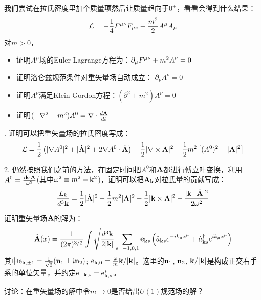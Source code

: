 \documentclass[CJK]{beamer}
\begin{document}
\begin{frame}
\bch
我们尝试在拉氏密度里加个质量项然后让质量趋向于$0^+$，看看会得到什么结果：
$${\mathcal{L}} = -\frac{1}{4}{F^{\mu\nu}}{F_{\mu\nu}} + \frac{m^2}{2} A^\mu A_\mu $$
对$m>0$，
\begin{itemize}
\item{证明$A^\mu$场的Euler-Lagrange方程为：$\partial_\mu {F^{\mu\nu}} + m^2 A^\nu = 0$}
\item{证明洛仑兹规范条件对重矢量场自动成立： $\partial_\nu A^\nu = 0$}
\item{证明$A^\nu$满足Klein-Gordon方程：$(\partial^2 + m^2) A^\nu = 0$}
\item{证明$(-\nabla^2+m^2)A^0 = \nabla \cdot \frac{d{\mathbf{A}}}{dt}$}
\end{itemize}

\ech
\end{frame}

\begin{frame}
. 证明可以把重矢量场的拉氏密度写成：
$${\mathcal{L}} = \frac{1}{2} \left( |\nabla A^0|^2  + |\dot{{\mathbf{A}}}|^2 + 2 \nabla A^0 \cdot \dot{{\mathbf{A}}} \right) - \frac{1}{2}|\nabla \times {\mathbf{A}}|^2 + \frac{1}{2}m^2 \left[(A^0)^2 - |{\mathbf{A}}|^2\right]$$ 

2. 仍然按照我们之前的方法，在固定时间把$A^0$和${\mathbf{A}}$都进行傅立叶变换，利用$A^0 = \frac{i{\mathbf{k}} \cdot\dot {{\mathbf{A}}}}{\omega^2}$(其中$\omega^2 \equiv m^2 + {\mathbf{k}}^2$)，证明可以把${\mathbf{A}}_{\mathbf{k}}$对拉氏量的贡献写成：
$$\frac{L_k}{d^3{\mathbf{k}}} = \frac{1}{2}|\dot{{\mathbf{A}}}|^2 - \frac{1}{2}m^2|{\mathbf{A}}|^2- \frac{1}{2}|{\mathbf{k}}\times{\mathbf{A}}|^2 - \frac{|{\mathbf{k}}\cdot\dot{{\mathbf{A}}}|^2}{2\omega^2}$$

\ech
\end{frame}

\begin{frame}
\bch
证明重矢量场${\mathbf{A}}$的解为：
$$\hat{{\mathbf{A}}}(x) = \frac{1}{(2\pi)^{3/2}} \int \sqrt{\frac{d^3{\mathbf{k}}}{2|{\mathbf{k}}|}} \sum_{s=-1,0,1}\mathbf{e}_{{\mathbf{k}} s}\left({\hat{a}}_{{\mathbf{k}} s} e^{-ik_\mu x^\mu} + {\hat{a}^\dagger}_{{\mathbf{k}} s}e^{ik_\mu x^\mu}\right) $$
其中$\mathrm{e}_{{\mathbf{k}},\pm 1} = \frac{1}{\sqrt{2}}({\mathbf{n}}_1 \pm {\dot{\imath}} {\mathbf{n}}_2)$; $\mathrm{e}_{{\mathbf{k}}, 0} = \frac{\omega}{m} {\mathbf{k}}/|{\mathbf{k}}|$。这里的${\mathbf{n}}_1$, ${\mathbf{n}}_2$, ${\mathbf{k}}/|{\mathbf{k}}|$是构成正交右手系的单位矢量，并约定$\mathrm{e}_{-{\mathbf{k}}, s} = \mathrm{e}_{{\mathbf{k}},s}^*$。 

\skipline

讨论：在重矢量场的解中令$m\rightarrow 0$是否给出$U(1)$规范场的解？
\ech
\end{frame}
\end{document}
